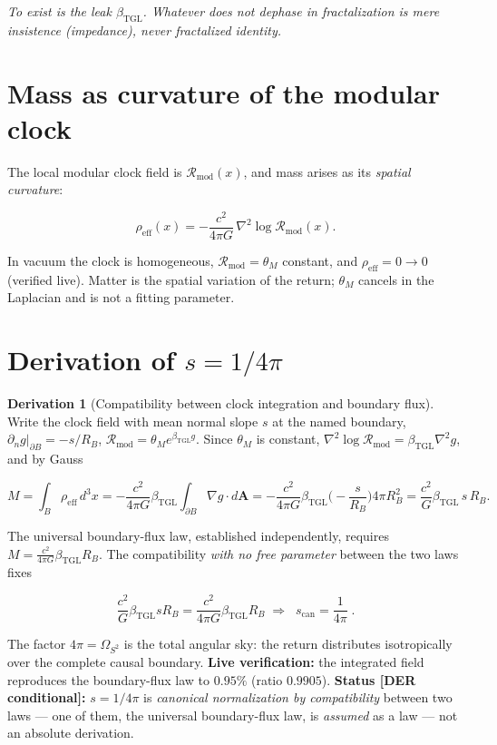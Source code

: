 \documentclass[11pt]{article}
\newcommand{\bTGL}{\beta_{\mathrm{TGL}}}\newcommand{\Msun}{M_{\odot}}\newcommand{\TGL}{\mathrm{TGL}}
\theoremstyle{definition}\newtheorem{deriv}{Derivation}
\begin{document}
\emph{To exist is the leak $\bTGL$. Whatever does not dephase in fractalization is mere insistence (impedance), never fractalized identity.}

\section{Mass as curvature of the modular clock}

The local modular clock field is $\mathcal{R}_{\mathrm{mod}}(x)$, and mass arises as its \emph{spatial curvature}:

\begin{equation}\rho_{\mathrm{eff}}(x)=-\frac{c^2}{4\pi G}\,\nabla^2\log \mathcal{R}_{\mathrm{mod}}(x).\end{equation}

In vacuum the clock is homogeneous, $\mathcal{R}_{\mathrm{mod}}=\theta_M$ constant, and $\rho_{\mathrm{eff}}=0\to 0$ (verified live). Matter is the spatial variation of the return; $\theta_M$ cancels in the Laplacian and is not a fitting parameter.

\section{Derivation of $s=1/4\pi$}

\begin{deriv}[Compatibility between clock integration and boundary flux]

Write the clock field with mean normal slope $s$ at the named boundary, $\partial_n g|_{\partial B}=-s/R_B$, $\mathcal{R}_{\mathrm{mod}}=\theta_M e^{\bTGL g}$. Since $\theta_M$ is constant, $\nabla^2\log\mathcal{R}_{\mathrm{mod}}=\bTGL\nabla^2 g$, and by Gauss

\begin{equation}M=\int_B\rho_{\mathrm{eff}}\,d^3x=-\frac{c^2}{4\pi G}\bTGL\!\int_{\partial B}\!\nabla g\cdot d\mathbf{A}=-\frac{c^2}{4\pi G}\bTGL\Big(\!-\frac{s}{R_B}\Big)4\pi R_B^2=\frac{c^2}{G}\bTGL\,s\,R_B.\end{equation}

The universal boundary-flux law, established independently, requires $M=\frac{c^2}{4\pi G}\bTGL R_B$. The compatibility \emph{with no free parameter} between the two laws fixes

\begin{equation}\frac{c^2}{G}\bTGL s R_B=\frac{c^2}{4\pi G}\bTGL R_B\;\Longrightarrow\;\boxed{\;s_{\mathrm{can}}=\frac{1}{4\pi}\;}.\end{equation}

The factor $4\pi=\Omega_{S^2}$ is the total angular sky: the return distributes isotropically over the complete causal boundary. \textbf{Live verification:} the integrated field reproduces the boundary-flux law to $0.95\%$ (ratio $0.9905$). \textbf{Status \textsf{[DER conditional]}:} $s=1/4\pi$ is \emph{canonical normalization by compatibility} between two laws --- one of them, the universal boundary-flux law, is \emph{assumed} as a law --- not an absolute derivation.\end{deriv}
\end{document}
